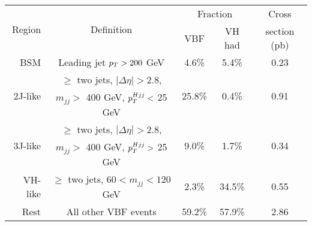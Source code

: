 \begin{tabular}{ r | c | c | c | c } 
\hline
\multirow{2}{*}{Region}  & \multirow{2}{*}{Definition}             & \multicolumn{2}{c}{Fraction}                          & Cross \\ 
                         &                                         & \multicolumn{1}{c}{VBF}      & VH had                 & section (pb) \\ 
\hline
BSM                      & Leading jet $p_T > 200$ GeV             &  4.6\%                       & 5.4\%                  & 0.23                  \\ 
\hline
\multirow{2}{*}{2J-like} & $\ge$ two jets, $|\Delta\eta| > 2.8$,   & \multirow{2}{*}{25.8\%}      & \multirow{2}{*}{0.4\%} & \multirow{2}{*}{0.91} \\
                         & $m_{jj} >$ 400 GeV, $p_T^{Hjj} <$ 25 GeV   &                              &                        &                       \\
\hline
\multirow{2}{*}{3J-like} & $\ge$ two jets, $|\Delta\eta| > 2.8$,   & \multirow{2}{*}{9.0\%}       & \multirow{2}{*}{1.7\%} & \multirow{2}{*}{0.34} \\ 
                         & $m_{jj} >$ 400 GeV, $p_T^{Hjj} >$ 25 GeV   &                              &                        &                       \\
\hline
VH-like                  & $\ge$ two jets, $60 < m_{jj} < 120$ GeV &  2.3\%                       & 34.5\%                 & 0.55 \\
\hline
Rest                     & All other VBF events                    & 59.2\%                       & 57.9\%                 & 2.86 \\ 
\hline
\end{tabular}

